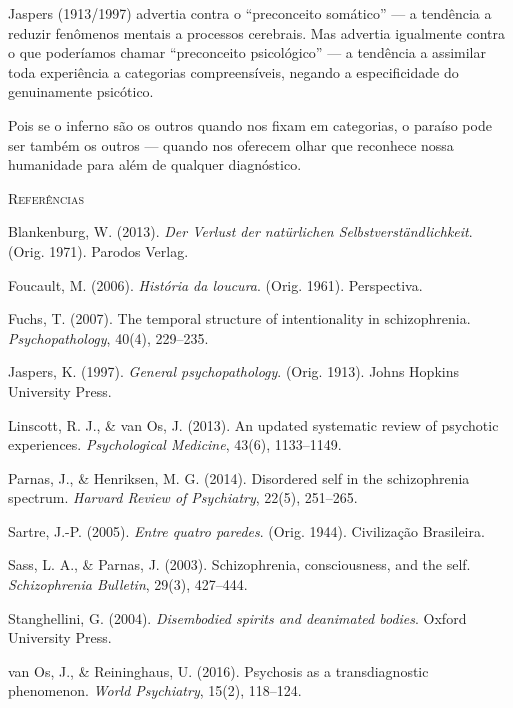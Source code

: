 Jaspers (1913/1997) advertia contra o \enquote{preconceito somático} --- a tendência a reduzir fenômenos mentais a processos cerebrais. Mas advertia igualmente contra o que poderíamos chamar \enquote{preconceito psicológico} --- a tendência a assimilar toda experiência a categorias compreensíveis, negando a especificidade do genuinamente psicótico.

Pois se o inferno são os outros quando nos fixam em categorias, o paraíso pode ser também os outros --- quando nos oferecem olhar que reconhece nossa humanidade para além de qualquer diagnóstico.

\vspace{2em}
\begin{small}
\noindent\textsc{Referências}

\vspace{1em}
\noindent Blankenburg, W. (2013). \textit{Der Verlust der natürlichen Selbstverständlichkeit}. (Orig. 1971). Parodos Verlag.

\noindent Foucault, M. (2006). \textit{História da loucura}. (Orig. 1961). Perspectiva.

\noindent Fuchs, T. (2007). The temporal structure of intentionality in schizophrenia. \textit{Psychopathology}, 40(4), 229--235.

\noindent Jaspers, K. (1997). \textit{General psychopathology}. (Orig. 1913). Johns Hopkins University Press.

\noindent Linscott, R. J., \& van Os, J. (2013). An updated systematic review of psychotic experiences. \textit{Psychological Medicine}, 43(6), 1133--1149.

\noindent Parnas, J., \& Henriksen, M. G. (2014). Disordered self in the schizophrenia spectrum. \textit{Harvard Review of Psychiatry}, 22(5), 251--265.

\noindent Sartre, J.-P. (2005). \textit{Entre quatro paredes}. (Orig. 1944). Civilização Brasileira.

\noindent Sass, L. A., \& Parnas, J. (2003). Schizophrenia, consciousness, and the self. \textit{Schizophrenia Bulletin}, 29(3), 427--444.

\noindent Stanghellini, G. (2004). \textit{Disembodied spirits and deanimated bodies}. Oxford University Press.

\noindent van Os, J., \& Reininghaus, U. (2016). Psychosis as a transdiagnostic phenomenon. \textit{World Psychiatry}, 15(2), 118--124.
\end{small}
